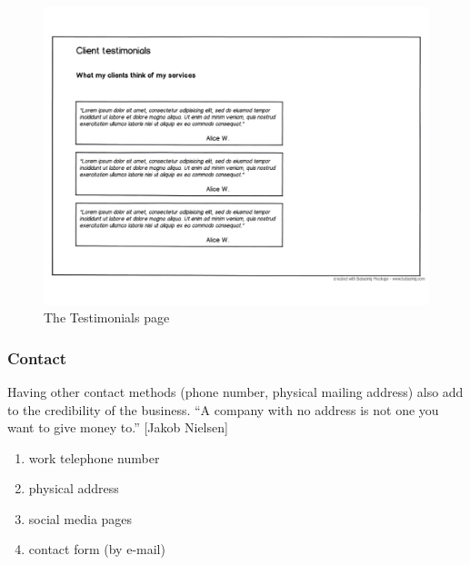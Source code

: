 \documentclass{l3proj}
\begin{document}
\begin{figure}
\label{wireframes:testimonials}
\begin{center}
\includegraphics[width=\linewidth, trim = 0px 80px 0px 220px]
	{wireframes/testimonials}
\caption{The Testimonials page}
\end{center}
\end{figure}


\subsubsection{Contact}
Having other contact methods (phone number, physical mailing address) also add
to the credibility of the business. ``A company with no address is not one you
want to give money to.'' [Jakob Nielsen]
\begin{enumerate} \itemsep1pt \parskip0pt 
	\item work telephone number
	\item physical address
	\item social media pages
	\item contact form (by e-mail)
\end{enumerate}
\end{document}
